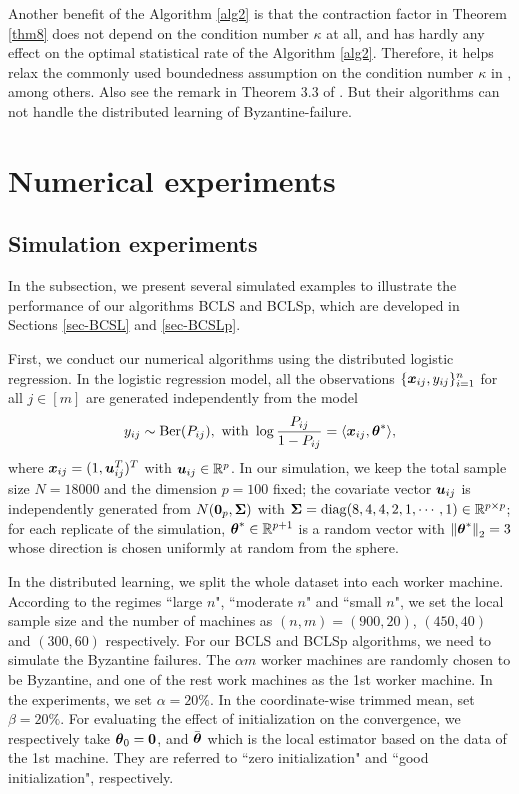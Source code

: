 \documentclass[12pt,a4paper]{article}%
\newcommand{\be}{\begin{equation}}
\newcommand{\ee}{\end{equation}}
\newcommand \vc[1]{{\mbox{\boldmath${#1}$}}}
\newcommand \vtheta{\vc \theta}
\numberwithin{equation}{section}
\newcommand{\norm}[1]{\left\Vert#1\right\Vert}  %
\begin{document}
Another benefit of the Algorithm \ref{alg2} is that the contraction factor in Theorem \ref{thm8} does not depend on the condition number $\kappa$ at all, and has hardly any effect on the optimal statistical rate of the Algorithm \ref{alg2}. Therefore, it helps relax the commonly used boundedness assumption on the condition number $\kappa$ in \cite{ZhangDuchiW2013}, \cite{JordanLeeYang2019} among others. Also see the remark in Theorem 3.3 of \cite{FanGuoWang2019}. But their algorithms can not handle the distributed learning of Byzantine-failure.



\section{Numerical experiments}\label{sec-NumericalExp}

\subsection{Simulation experiments}\label{sec-simulation}

In the subsection, we present several simulated examples  to illustrate the performance of our algorithms BCLS and BCLSp, which are developed in Sections \ref{sec-BCSL} and \ref{sec-BCSLp}.

First, we conduct our numerical algorithms using the distributed logistic regression. In the logistic regression model, all the observations $\{\vc x_{ij},y_{ij}\}_{i=1}^n$ for all $j\in[m]$ are generated independently from the model
\be\label{eq-sec5-model}
y_{ij}\sim \mathrm{Ber}(P_{ij}), ~\mathrm{with}~\log\frac{P_{ij}}{1-P_{ij}}=\langle\vc x_{ij},\vtheta^*\rangle,
\ee
where $\vc x_{ij}=(1,\vc u_{ij}^T)^T$ with $\vc u_{ij}\in \mathbb{R}^p$.
In our simulation, we keep the total sample size $N=18000$ and the dimension $p=100$ fixed; the covariate vector $\vc u_{ij}$ is independently generated from $N(\vc 0_p,\vc\Sigma)$ with $\vc \Sigma=\mathrm{diag}(8,4,4,2,1,\cdots,1)\in \mathbb{R}^{p\times p}$; for each replicate of the simulation, $\vtheta^*\in \mathbb{R}^{p+1}$ is a random vector with $\norm{\vtheta^*}_2=3$ whose direction is chosen uniformly at random from the sphere.

In the distributed learning, we split the whole dataset into each worker machine. According to the regimes ``large $n$", ``moderate $n$" and ``small $n$", we set the local sample size and the number of machines as $(n,m)=(900,20)$, $(450,40)$ and $(300,60)$ respectively. For our BCLS and BCLSp algorithms, we need to simulate the Byzantine failures. The $\alpha m$ worker machines are randomly chosen to be Byzantine, and one of the rest work machines as the 1st worker machine. In the experiments, we set $\alpha=20\%$. In the coordinate-wise trimmed mean, set $\beta=20\%$. For evaluating the effect of initialization on the convergence, we respectively take $\vtheta_0=\vc 0$, and $\bar{\vtheta}$ which is the local estimator based on the data of the 1st machine. They are referred to ``zero initialization" and ``good initialization", respectively.
\end{document}
